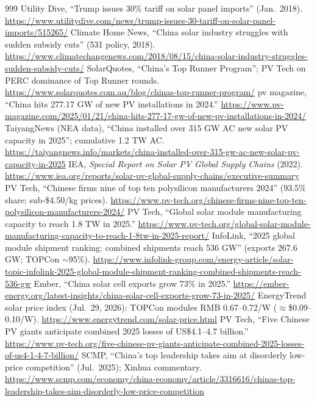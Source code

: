 \begin{thebibliography}{999}
 Utility Dive, ``Trump issues 30\% tariff on solar panel imports'' (Jan.\ 2018). \url{https://www.utilitydive.com/news/trump-issues-30-tariff-on-solar-panel-imports/515265/}
 Climate Home News, ``China solar industry struggles with sudden subsidy cuts'' (531 policy, 2018). \url{https://www.climatechangenews.com/2018/08/15/china-solar-industry-struggles-sudden-subsidy-cuts/}
 SolarQuotes, ``China's Top Runner Program''; PV Tech on PERC dominance of Top Runner rounds. \url{https://www.solarquotes.com.au/blog/chinas-top-runner-program/}
 pv magazine, ``China hits 277.17 GW of new PV installations in 2024.'' \url{https://www.pv-magazine.com/2025/01/21/china-hits-277-17-gw-of-new-pv-installations-in-2024/}
 TaiyangNews (NEA data), ``China installed over 315 GW AC new solar PV capacity in 2025''; cumulative 1.2 TW AC. \url{https://taiyangnews.info/markets/china-installed-over-315-gw-ac-new-solar-pv-capacity-in-2025}
 IEA, \emph{Special Report on Solar PV Global Supply Chains} (2022). \url{https://www.iea.org/reports/solar-pv-global-supply-chains/executive-summary}
 PV Tech, ``Chinese firms nine of top ten polysilicon manufacturers 2024'' (93.5\% share; sub-\$4.50/kg prices). \url{https://www.pv-tech.org/chinese-firms-nine-top-ten-polysilicon-manufacturers-2024/}
 PV Tech, ``Global solar module manufacturing capacity to reach 1.8 TW in 2025.'' \url{https://www.pv-tech.org/global-solar-module-manufacturing-capacity-to-reach-1-8tw-in-2025-report/}
 InfoLink, ``2025 global module shipment ranking: combined shipments reach 536 GW'' (exports 267.6 GW; TOPCon $\sim$95\%). \url{https://www.infolink-group.com/energy-article/solar-topic-infolink-2025-global-module-shipment-ranking-combined-shipments-reach-536-gw}
 Ember, ``China solar cell exports grow 73\% in 2025.'' \url{https://ember-energy.org/latest-insights/china-solar-cell-exports-grow-73-in-2025/}
 EnergyTrend solar price index (Jul.\ 29, 2026): TOPCon modules RMB 0.67--0.72/W ($\approx$\$0.09--0.10/W). \url{https://www.energytrend.com/solar-price.html}
 PV Tech, ``Five Chinese PV giants anticipate combined 2025 losses of US\$4.1--4.7 billion.'' \url{https://www.pv-tech.org/five-chinese-pv-giants-anticipate-combined-2025-losses-of-us4-1-4-7-billion/}
 SCMP, ``China's top leadership takes aim at disorderly low-price competition'' (Jul.\ 2025); Xinhua commentary. \url{https://www.scmp.com/economy/china-economy/article/3316616/chinas-top-leadership-takes-aim-disorderly-low-price-competition}

\end{thebibliography}
